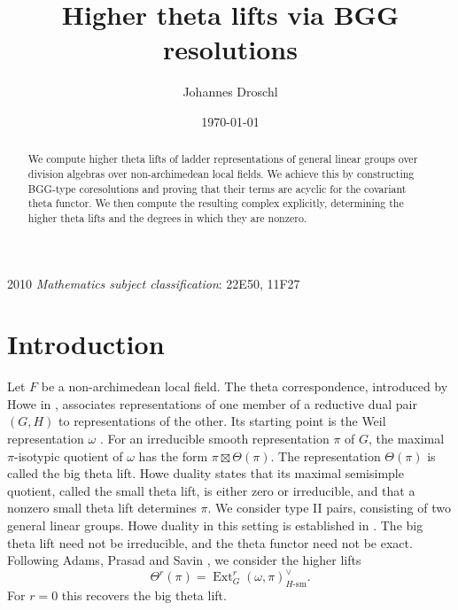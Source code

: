 \documentclass[10pt,a4paper]{article}
\title{Higher theta lifts via BGG resolutions}
\author{Johannes Droschl}
\date{\today}
\theoremstyle{definition}
\theoremstyle{remark}
\numberwithin{equation}{section}
\newcommand{\sm}{\mathrm{sm}}
\DeclareMathOperator{\Ext}{Ext}
\begin{document}
\maketitle
\begin{abstract}
We compute higher theta lifts of ladder representations of general linear
groups over division algebras over non-archimedean local fields.
We achieve this by constructing BGG-type
coresolutions and proving that their terms are acyclic for the covariant
theta functor. We then compute the resulting complex explicitly,
determining the higher theta lifts and the degrees in which they
are nonzero.
\end{abstract}
2010 \textit{Mathematics subject classification}: 22E50, 11F27
\section{Introduction}
Let $F$ be a non-archimedean local field.
The theta correspondence, introduced by Howe in \cite{Howe1979}, associates
representations of one member of a reductive dual pair $(G,H)$ to
representations of the other. Its starting point is the Weil
representation $\omega$ \cite{Weil1964}. For an irreducible smooth
representation $\pi$ of $G$, the maximal $\pi$-isotypic quotient of
$\omega$ has the form $\pi\boxtimes\Theta(\pi)$. The representation
$\Theta(\pi)$ is called the big theta lift. Howe duality states that
its maximal semisimple quotient, called the small theta lift, is either
zero or irreducible, and that a nonzero small theta lift determines $\pi$.
We consider type II pairs, consisting of two general linear groups.
Howe duality in this setting is established in \cite{Minguez2008}.
The big theta lift need not be irreducible, and the theta functor need
not be exact. Following Adams, Prasad and Savin \cite{APS2017}, we
consider the higher lifts
\[
\Theta^r(\pi)
=\Ext_G^r(\omega,\pi)_{H\text{-}\sm}^{\vee}.
\]
For $r=0$ this recovers the big theta lift. 
\end{document}
